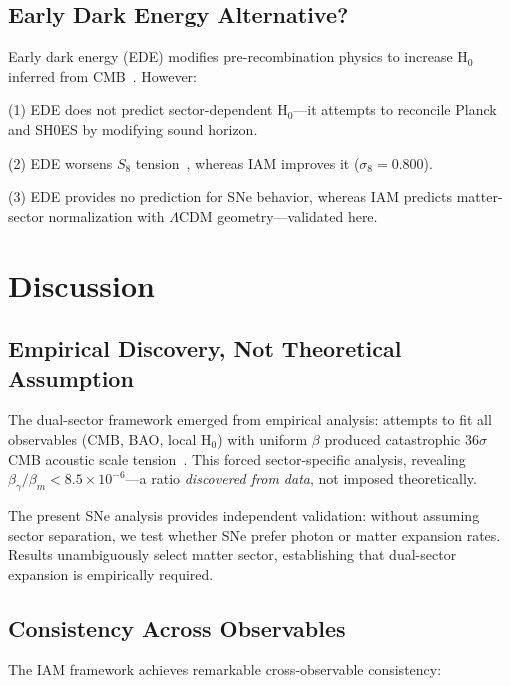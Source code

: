 \documentclass[twocolumn,superscriptaddress,prd,amsmath,amssymb]{revtex4-2}
\begin{document}
\subsection{Early Dark Energy Alternative?}

Early dark energy (EDE) modifies pre-recombination physics to increase H$_0$ inferred from CMB~\cite{Kamionkowski2023}. However:

(1) EDE does not predict sector-dependent H$_0$---it attempts to reconcile Planck and SH0ES by modifying sound horizon.

(2) EDE worsens $S_8$ tension~\cite{Hill2020}, whereas IAM improves it ($\sigma_8 = 0.800$).

(3) EDE provides no prediction for SNe behavior, whereas IAM predicts matter-sector normalization with $\Lambda$CDM geometry---validated here.

\section{Discussion}

\subsection{Empirical Discovery, Not Theoretical Assumption}

The dual-sector framework emerged from empirical analysis: attempts to fit all observables (CMB, BAO, local H$_0$) with uniform $\beta$ produced catastrophic 36$\sigma$ CMB acoustic scale tension~\cite{IAMManuscript2025}. This forced sector-specific analysis, revealing $\beta_\gamma/\beta_m < 8.5 \times 10^{-6}$---a ratio \textit{discovered from data}, not imposed theoretically.

The present SNe analysis provides independent validation: without assuming sector separation, we test whether SNe prefer photon or matter expansion rates. Results unambiguously select matter sector, establishing that dual-sector expansion is empirically required.

\subsection{Consistency Across Observables}

The IAM framework achieves remarkable cross-observable consistency:
\end{document}
